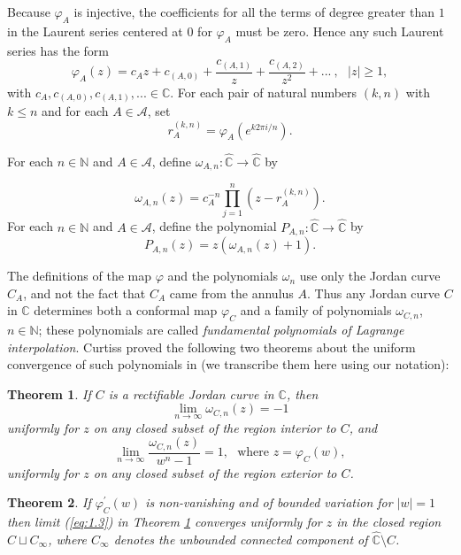 \documentclass[a4paper,11pt,onecolumn]{amsart}
\newtheorem{theorem}{Theorem}[section]
\theoremstyle{definition}
\begin{document}
Because $\varphi_A$ is injective, the coefficients for all the terms of degree greater than $1$ in the Laurent series centered at $0$ for $\varphi_A$ must be zero.  Hence any such Laurent series has the form 
$$\varphi_A(z) = c_Az + c_{(A,0)} + \frac{c_{(A,1)}}{z} + \frac{c_{(A,2)}}{z^2} + ... \ , \ \ \  |z| \geq 1,$$ with $c_A, c_{(A,0)}, c_{(A,1)},... \in \mathbb{C}$.  For each pair of natural numbers $(k,n)$ with $k \leq n$ and for each $A \in \mathcal{A}$, set 
$$r_A^{(k,n)} = \varphi_A(e^{k2\pi i/n}).$$

For each $n \in \mathbb{N}$ and $A \in \mathcal{A}$, define $\omega_{A,n}: \hat{\mathbb{C}} \rightarrow \hat{\mathbb{C}}$ by 

$$ \omega_{A,n}(z) = c_A^{-n}\prod_{j=1}^n (z-r_A^{(k,n)}). $$
For each $n \in \mathbb{N}$ and $A \in \mathcal{A}$, define the polynomial $P_{A,n}:\hat{\mathbb{C}} \rightarrow \hat{\mathbb{C}}$ by $$P_{A,n}(z) = z(\omega_{A,n}(z)+1).$$ 

The definitions of the map $\varphi$ and the polynomials $\omega_n$ use only the Jordan curve $C_A$, and not the fact that $C_A$ came from the annulus $A$.  Thus any Jordan curve $C$ in $\mathbb{C}$ determines both a conformal map $\varphi_C$ and a family of polynomials $\omega_{C,n}$, $n \in \mathbb{N}$; these polynomials are called \emph{fundamental polynomials of Lagrange interpolation}.  Curtiss proved the following two theorems about the uniform convergence of such polynomials in \cite{Curtiss} (we transcribe them here using our notation):

\begin{theorem} \label{t:Curtiss} \cite{Curtiss}
If $C$ is a rectifiable Jordan curve in $\mathbb{C}$, then 
\begin{equation} \label{eq:1.2} \lim_{n \rightarrow \infty} \omega_{C,n}(z) = -1\end{equation}
uniformly for $z$ on any closed subset of the region interior to $C$, and 
\begin{equation} \label{eq:1.3} \lim_{n \rightarrow \infty} \frac{\omega_{C,n}(z)}{w^n -1} = 1, \ \ \  \textrm{where } z=\varphi_C(w),\end{equation}
 uniformly for $z$ on any closed subset of the region exterior to $C$. 
\end{theorem}

\begin{theorem} \cite{Curtiss} \label{t:Curtiss2} If $\varphi_C^{\prime}(w)$ is non-vanishing and of bounded variation for $|w|=1$ then limit (\ref{eq:1.3}) in Theorem \ref{t:Curtiss} converges uniformly for $z$ in the closed region $C \sqcup C_{\infty}$, where $C_{\infty}$ denotes the unbounded connected component of $\hat{\mathbb{C}} \setminus C$.  
\end{theorem}
\end{document}
